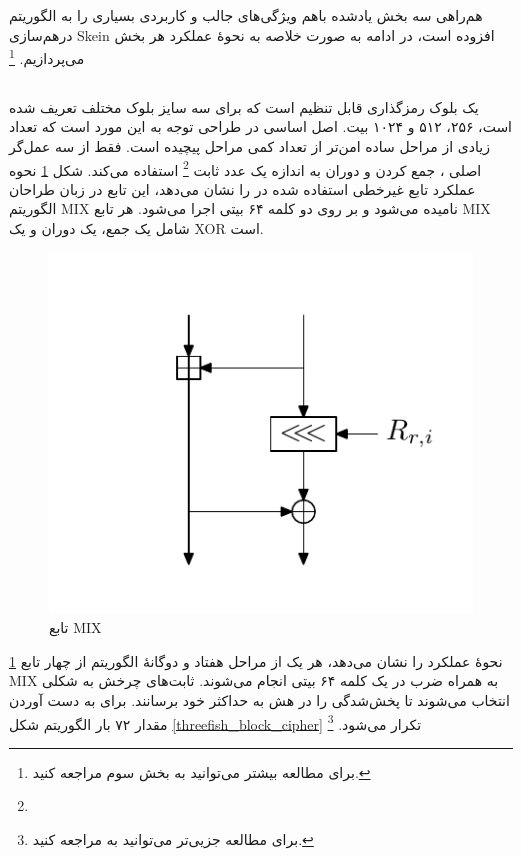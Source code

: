هم‌راهی سه بخش یادشده باهم ویژگی‌های جالب و کاربردی بسیاری را به الگوریتم درهم‌سازی 
Skein 
افزوده است، در ادامه به صورت خلاصه به نحوهٔ عملکرد هر بخش می‌پردازیم.
\footnote{برای مطالعه بیشتر می‌توانید به بخش سوم 
	\cite{main_doc} مراجعه کنید. }


\subsection{}
یک بلوک رمزگذاری قابل تنظیم است که برای سه سایز بلوک مختلف تعریف شده است، ۲۵۶، ۵۱۲ و ۱۰۲۴ بیت. 
اصل اساسی در طراحی 
توجه به این مورد است که تعداد زیادی از مراحل ساده امن‌تر از تعداد کمی مراحل پیچیده است.
فقط از سه عمل‌گر اصلی 
، جمع کردن و دوران به اندازه یک عدد ثابت
\footnote{}
استفاده می‌کند. 
شکل 
\ref{threefish_mix_function}
نحوه عملکرد تابع غیرخطی استفاده شده در 
را نشان می‌دهد، این تابع در زبان طراحان الگوریتم 
MIX
نامیده می‌شود و بر روی دو کلمه ۶۴ بیتی اجرا می‌شود. هر تابع 
MIX
شامل یک جمع، یک دوران و یک 
XOR
است. 
\begin{figure}
	\centering
	\includegraphics[scale=0.6]{figs/threefish_mix_function.png}
	\caption{تابع MIX}
	\label{threefish_mix_function}
\end{figure}

\ref{threefish_mix_function}
نحوهٔ عملکرد 
را نشان می‌دهد، هر یک از مراحل هفتاد و دوگانهٔ الگوریتم
از چهار تابع MIX
به همراه ضرب در یک کلمه ۶۴ بیتی انجام می‌شوند. ثابت‌های چرخش به شکلی انتخاب می‌شوند تا پخش‌شدگی را در هش به حداکثر خود برسانند. 
برای به دست آوردن مقدار 
۷۲ بار الگوریتم شکل
\ref{threefish_block_cipher}
تکرار می‌شود.
\footnote{برای مطالعه جزیی‌تر می‌توانید به 
	\cite{main_doc}
مراجعه کنید.}

